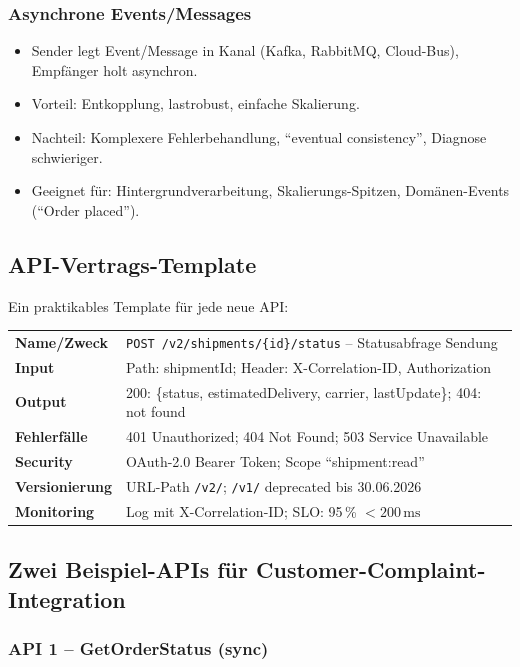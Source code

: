 \documentclass[11pt,a4paper,oneside]{article}
\begin{document}
\subsubsection{Asynchrone Events/Messages}

\begin{itemize}
  \item Sender legt Event/Message in Kanal (Kafka, RabbitMQ, Cloud-Bus), Empfänger holt asynchron.
  \item Vorteil: Entkopplung, lastrobust, einfache Skalierung.
  \item Nachteil: Komplexere Fehlerbehandlung, ``eventual consistency'', Diagnose schwieriger.
  \item Geeignet für: Hintergrundverarbeitung, Skalierungs-Spitzen, Domänen-Events (``Order placed'').
\end{itemize}

\subsection{API-Vertrags-Template}

Ein praktikables Template für jede neue API:

\begin{tabularx}{\linewidth}{@{}>{\bfseries}lX@{}}
\toprule
Name/Zweck & \texttt{POST /v2/shipments/\{id\}/status} -- Statusabfrage Sendung \\
Input & Path: shipmentId; Header: X-Correlation-ID, Authorization \\
Output & 200: \{status, estimatedDelivery, carrier, lastUpdate\}; 404: not found \\
Fehlerfälle & 401 Unauthorized; 404 Not Found; 503 Service Unavailable \\
Security & OAuth-2.0 Bearer Token; Scope ``shipment:read'' \\
Versionierung & URL-Path \texttt{/v2/}; \texttt{/v1/} deprecated bis 30.06.2026 \\
Monitoring & Log mit X-Correlation-ID; SLO: 95\,\% $<200\,\text{ms}$ \\
\bottomrule
\end{tabularx}

\medskip

\subsection{Zwei Beispiel-APIs für Customer-Complaint-Integration}

\subsubsection{API 1 -- GetOrderStatus (sync)}
\end{document}
